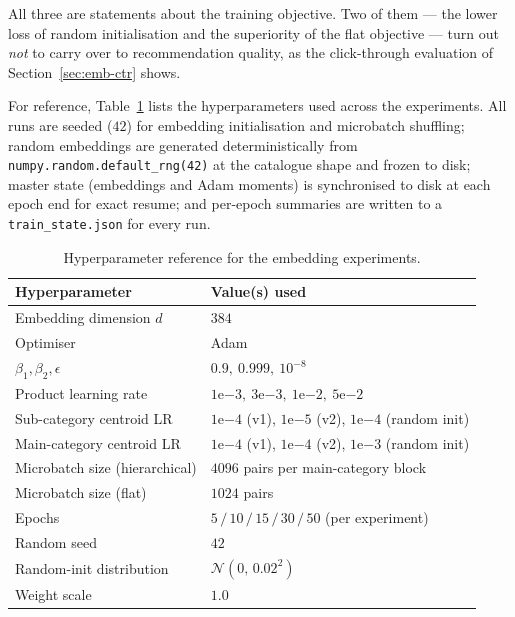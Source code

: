 All three are statements about the training objective. Two of them --- the
lower loss of random initialisation and the superiority of the flat objective
--- turn out \emph{not} to carry over to recommendation quality, as the
click-through evaluation of Section~\ref{sec:emb-ctr} shows.

For reference, Table~\ref{tab:emb-hparams} lists the hyperparameters used across
the experiments. All runs are seeded ($42$) for embedding initialisation and
microbatch shuffling; random embeddings are generated deterministically from
\texttt{numpy.random.default\_rng(42)} at the catalogue shape and frozen to
disk; master state (embeddings and Adam moments) is synchronised to disk at each
epoch end for exact resume; and per-epoch summaries are written to a
\texttt{train\_state.json} for every run.

\begin{table}[ht]
  \centering
  \caption{Hyperparameter reference for the embedding experiments.}
  \label{tab:emb-hparams}
  \begin{tabular}{ll}
    \toprule
    Hyperparameter & Value(s) used \\
    \midrule
    Embedding dimension $d$          & $384$ \\
    Optimiser                        & Adam \\
    $\beta_1,\beta_2,\epsilon$       & $0.9,\ 0.999,\ 10^{-8}$ \\
    Product learning rate            & $1\mathrm{e}{-3},\ 3\mathrm{e}{-3},\ 1\mathrm{e}{-2},\ 5\mathrm{e}{-2}$ \\
    Sub-category centroid LR         & $1\mathrm{e}{-4}$ (v1), $1\mathrm{e}{-5}$ (v2), $1\mathrm{e}{-4}$ (random init) \\
    Main-category centroid LR        & $1\mathrm{e}{-4}$ (v1), $1\mathrm{e}{-4}$ (v2), $1\mathrm{e}{-3}$ (random init) \\
    Microbatch size (hierarchical)   & $4096$ pairs per main-category block \\
    Microbatch size (flat)           & $1024$ pairs \\
    Epochs                           & $5\,/\,10\,/\,15\,/\,30\,/\,50$ (per experiment) \\
    Random seed                      & $42$ \\
    Random-init distribution         & $\mathcal{N}(0,\,0.02^2)$ \\
    Weight scale                     & $1.0$ \\
    \bottomrule
  \end{tabular}
\end{table}

